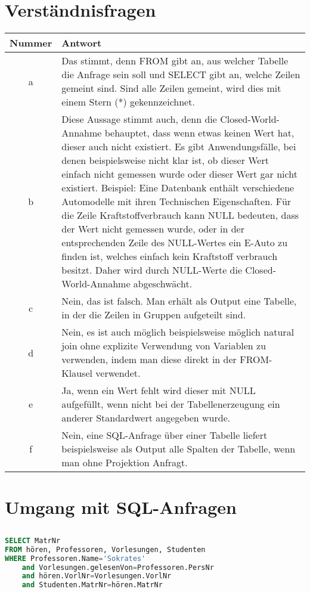 \documentclass{scrartcl}
\begin{document}
\maketitle

\section{Verständnisfragen} 
\begin{tabular}{c|p{13cm}}
    Nummer & Antwort\\
    \hline 
    a & Das stimmt, denn FROM gibt an, aus welcher Tabelle die Anfrage sein soll und SELECT gibt an, welche Zeilen gemeint sind. Sind alle Zeilen gemeint, wird dies mit einem Stern (*) gekennzeichnet.\\
    \hline
    b & Diese Aussage stimmt auch, denn die Closed-World-Annahme behauptet, dass wenn etwas keinen Wert hat, dieser auch nicht existiert. Es gibt Anwendungsfälle, bei denen beispielsweise nicht klar ist, ob dieser Wert einfach nicht gemessen wurde oder dieser Wert gar nicht existiert. Beispiel: Eine Datenbank enthält verschiedene Automodelle mit ihren Technischen Eigenschaften. Für die Zeile Kraftstoffverbrauch kann NULL bedeuten, dass der Wert nicht gemessen wurde, oder in der entsprechenden Zeile des NULL-Wertes ein E-Auto zu finden ist, welches einfach kein Kraftstoff verbrauch besitzt. Daher wird durch NULL-Werte die Closed-World-Annahme abgeschwächt.\\
    \hline
    c & Nein, das ist falsch. Man erhält als Output eine Tabelle, in der die Zeilen in Gruppen aufgeteilt sind.\\
    \hline 
    d & Nein, es ist auch möglich beispielsweise möglich natural join ohne explizite Verwendung von Variablen zu verwenden, indem man diese direkt in der FROM-Klausel verwendet.\\
    \hline
    e & Ja, wenn ein Wert fehlt wird dieser mit NULL aufgefüllt, wenn nicht bei der Tabellenerzeugung ein anderer Standardwert angegeben wurde.\\
    \hline 
    f & Nein, eine SQL-Anfrage über einer Tabelle liefert beispielsweise als Output alle Spalten der Tabelle, wenn man ohne Projektion Anfragt.\\
\end{tabular}
\section{Umgang mit SQL-Anfragen} 
\subsection{}
\begin{lstlisting}[language=sql]
SELECT MatrNr 
FROM hören, Professoren, Vorlesungen, Studenten 
WHERE Professoren.Name='Sokrates'
    and Vorlesungen.gelesenVon=Professoren.PersNr
    and hören.VorlNr=Vorlesungen.VorlNr
    and Studenten.MatrNr=hören.MatrNr
\end{lstlisting}
\end{document}
